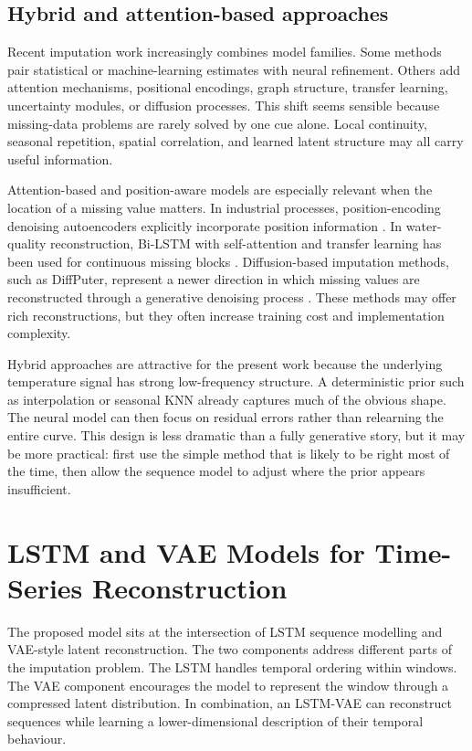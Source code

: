 \subsection{Hybrid and attention-based approaches}

Recent imputation work increasingly combines model families. Some methods pair statistical or machine-learning estimates with neural refinement. Others add attention mechanisms, positional encodings, graph structure, transfer learning, uncertainty modules, or diffusion processes. This shift seems sensible because missing-data problems are rarely solved by one cue alone. Local continuity, seasonal repetition, spatial correlation, and learned latent structure may all carry useful information.

Attention-based and position-aware models are especially relevant when the location of a missing value matters. In industrial processes, position-encoding denoising autoencoders explicitly incorporate position information \cite{Ou2024MissingDataIW}. In water-quality reconstruction, Bi-LSTM with self-attention and transfer learning has been used for continuous missing blocks \cite{Lyu2022}. Diffusion-based imputation methods, such as DiffPuter, represent a newer direction in which missing values are reconstructed through a generative denoising process \cite{Zhang2024DiffPuterED}. These methods may offer rich reconstructions, but they often increase training cost and implementation complexity.

Hybrid approaches are attractive for the present work because the underlying temperature signal has strong low-frequency structure. A deterministic prior such as interpolation or seasonal KNN already captures much of the obvious shape. The neural model can then focus on residual errors rather than relearning the entire curve. This design is less dramatic than a fully generative story, but it may be more practical: first use the simple method that is likely to be right most of the time, then allow the sequence model to adjust where the prior appears insufficient.

\section{LSTM and VAE Models for Time-Series Reconstruction}

The proposed model sits at the intersection of LSTM sequence modelling and VAE-style latent reconstruction. The two components address different parts of the imputation problem. The LSTM handles temporal ordering within windows. The VAE component encourages the model to represent the window through a compressed latent distribution. In combination, an LSTM-VAE can reconstruct sequences while learning a lower-dimensional description of their temporal behaviour.

